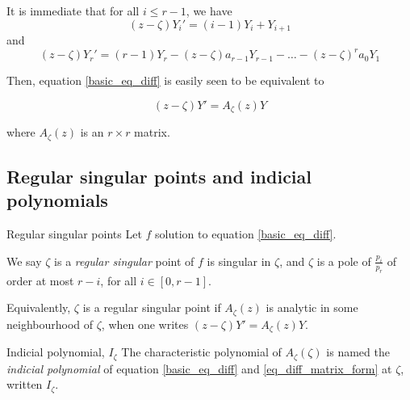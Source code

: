 \documentclass[../main.tex]{subfiles}
\begin{document}
It is immediate that for all $i \leq r - 1$, we have $${(z - \zeta)} Y_i' = (i-1)Y_i + Y_{i + 1}$$ and
$$ {(z - \zeta)} Y	_r' = (r - 1)Y_r - {(z - \zeta)} a_{r-1} Y_{r - 1} - \dots - {(z - \zeta)}^r a_0 Y_1 $$

Then, equation \ref{basic_eq_diff} is easily seen to be equivalent to

\begin{equation}\label{eq_diff_matrix_form}
{(z - \zeta)}Y' = A_\zeta(z)Y
\end{equation}

where $A_\zeta(z)$ is an $r \times r$ matrix.

\subsection{Regular singular points and indicial polynomials}


\begin{definition}{Regular singular points}
	Let $f$ solution to equation \eqref{basic_eq_diff}.
	
	We say $\zeta$ is a \emph{regular singular} point of $f$ is singular in $\zeta$, and $\zeta$ is a pole of $\frac{p_i}{p_r}$ of order at most $r - i$, for all $i \in [0, r - 1]$.
	
	Equivalently, $\zeta$ is a regular singular point if $A_\zeta(z)$ is analytic in some neighbourhood of $\zeta$, when one writes $(z - \zeta)Y' = A_\zeta(z) Y$.
\end{definition}

\begin{definition}{{Indicial polynomial, $I_\zeta$}}
	The characteristic polynomial of $A_\zeta(\zeta)$ is named the \emph{indicial polynomial} of equation \ref{basic_eq_diff} and \ref{eq_diff_matrix_form} at $\zeta$, written $I_\zeta$.
\end{definition}
\end{document}
